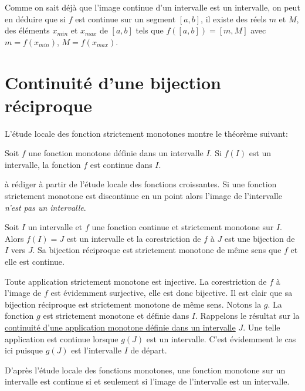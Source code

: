 \begin{rem}
 Comme on sait déjà que l'image continue d'un intervalle est un intervalle, on peut en déduire que si $f$ est continue sur un segment $[a,b]$, il existe des réels $m$ et $M$, des éléments $x_{min}$ et $x_{max}$ de $[a,b]$ tels que $f([a,b])=[m,M]$ avec $m=f(x_{min})$, $M=f(x_{max})$.
\end{rem}

\section{Continuité d'une bijection réciproque}
L'étude locale des fonction strictement monotones montre le théorème suivant:
\begin{thm}
 Soit $f$ une fonction monotone définie dans un intervalle $I$. Si $f(I)$ est un intervalle, la fonction $f$ est continue dans $I$.
\end{thm}
\begin{demo}
  à rédiger à partir de l'étude locale des fonctions croissantes. Si une fonction strictement monotone est discontinue en un point alors l'image de l'intervalle \emph{n'est pas un intervalle}.
\end{demo}

\begin{thm}
 Soit $I$ un intervalle et $f$ une fonction continue et strictement monotone sur $I$. Alors $f(I)=J$ est un intervalle et la corestriction de $f$ à $J$ est une bijection de $I$ vers $J$. Sa bijection réciproque est strictement monotone de même sens que $f$ et elle est continue.
\end{thm}
\begin{demo}
 Toute application strictement monotone est injective. La corestriction de $f$ à l'image de $f$ est évidemment surjective, elle est donc bijective. Il est clair que sa bijection réciproque est strictement monotone de même sens. Notons la $g$. La fonction $g$ est strictement monotone et définie dans $I$. Rappelons le résultat sur la \href{\baseurl C2064.pdf}{continuité d'une application monotone définie dans un intervalle} $J$. Une telle application est continue lorsque $g(J)$ est un intervalle. C'est évidemment le cas ici puisque $g(J)$ est l'intervalle $I$ de départ.
\end{demo}

D'après l'étude locale des fonctions monotones, une fonction monotone sur un intervalle est continue si et seulement si l'image de l'intervalle est un intervalle.



